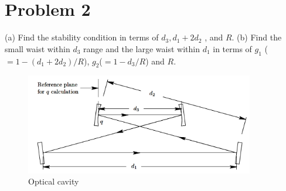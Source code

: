 \documentclass{article}
\begin{document}
\section{Problem 2}
(a) Find the stability condition in terms of $d_3 , d_1+2d_2$ , and $R$.
(b) Find the small waist within $d_3$ range and the large waist within $d_1$ in terms of $g_1$ ($=1-(d_1+2d_2 )/R$), $g_2$($=1-d_3/R$) and $R$.

\begin{figure}[ht]
	\centering
	\includegraphics[width=10cm]{f2.png}
	\caption{Optical cavity}
\end{figure}
\end{document}
